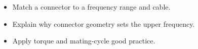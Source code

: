 \begin{objectives}
\begin{itemize}[leftmargin=1.4em,itemsep=2pt]
\item Match a connector to a frequency range and cable.
\item Explain why connector geometry sets the upper frequency.
\item Apply torque and mating-cycle good practice.
\end{itemize}
\end{objectives}
